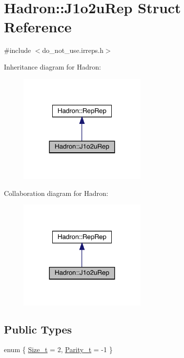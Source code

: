 \hypertarget{structHadron_1_1J1o2uRep}{}\section{Hadron\+:\+:J1o2u\+Rep Struct Reference}
\label{structHadron_1_1J1o2uRep}


{\ttfamily \#include $<$do\+\_\+not\+\_\+use.\+irreps.\+h$>$}



Inheritance diagram for Hadron\+:\nopagebreak
\begin{figure}[H]
\begin{center}
\leavevmode
\includegraphics[width=180pt]{de/d1a/structHadron_1_1J1o2uRep__inherit__graph}
\end{center}
\end{figure}


Collaboration diagram for Hadron\+:\nopagebreak
\begin{figure}[H]
\begin{center}
\leavevmode
\includegraphics[width=180pt]{de/d90/structHadron_1_1J1o2uRep__coll__graph}
\end{center}
\end{figure}
\subsection*{Public Types}
\begin{DoxyCompactItemize}
\item 
enum \{ \mbox{\hyperlink{structHadron_1_1J1o2uRep_a8ff214f878d30ec1fec7bd396e8f5c81a4a0ebe35f93bcd4eb30ffffa320f64a7}{Size\+\_\+t}} = 2, 
\mbox{\hyperlink{structHadron_1_1J1o2uRep_a8ff214f878d30ec1fec7bd396e8f5c81a270d970383c67ad8c94631d3337982a9}{Parity\+\_\+t}} = -\/1
 \}
\end{DoxyCompactItemize}
